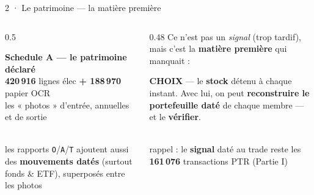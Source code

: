 \documentclass[11pt,aspectratio=169]{beamer}
\newcommand{\co}[1]{\texttt{#1}}
\newcommand{\choixbox}[1]{%
  \colorbox{alertred!8}{\parbox{\dimexpr\linewidth-8pt}{\scriptsize
    \textbf{\textcolor{alertred}{CHOIX}}\; --- #1}}}
\begin{document}
\begin{frame}{2 · Le patrimoine --- la matière première}
  \begin{columns}[c]
    \begin{column}{0.5\textwidth}
      \colorbox{dataC!12}{\parbox{0.95\linewidth}{\footnotesize\vspace{0.6mm}
        \textbf{Schedule A --- le patrimoine déclaré}\\[0.6mm]
        {\Large\textbf{420\,916}} lignes élec \textbf{+ 188\,970} papier OCR\\
        {\scriptsize les « photos » d'entrée, annuelles et de sortie}\vspace{0.6mm}}}\\[3mm]
      {\footnotesize\color{black!70} les rapports \co{O}/\co{A}/\co{T} ajoutent aussi des
       \textbf{mouvements datés} (surtout fonds \& ETF), superposés entre les photos}
    \end{column}
    \begin{column}{0.48\textwidth}
      {\footnotesize Ce n'est pas un \emph{signal} (trop tardif), mais c'est la
       \textbf{matière première} qui manquait :}\\[2mm]
      \choixbox{le \textbf{stock} détenu à chaque instant. Avec lui, on peut
       \textbf{reconstruire le portefeuille daté} de chaque membre --- et le
       \textbf{vérifier}.}\\[2mm]
      {\scriptsize\color{black!60} rappel : le \textbf{signal} daté au trade reste les
       \textbf{161\,076} transactions PTR (Partie I)}
    \end{column}
  \end{columns}
\end{frame}
\end{document}
